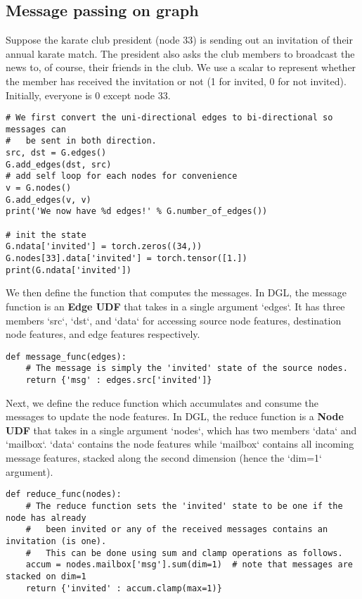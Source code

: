 \subsection{Message passing on graph}
Suppose the karate club president (node 33) is sending out an invitation of their annual karate match. The president also asks the club members to broadcast the news to, of course, their friends in the club. We use a scalar to represent whether the member has received the invitation or not (1 for invited, 0 for not invited). Initially, everyone is 0 except node 33.
\begin{verbatim}
# We first convert the uni-directional edges to bi-directional so messages can
#   be sent in both direction.
src, dst = G.edges()
G.add_edges(dst, src)
# add self loop for each nodes for convenience
v = G.nodes()
G.add_edges(v, v)
print('We now have %d edges!' % G.number_of_edges())

# init the state
G.ndata['invited'] = torch.zeros((34,))
G.nodes[33].data['invited'] = torch.tensor([1.])
print(G.ndata['invited'])
\end{verbatim}

We then define the function that computes the messages. In DGL, the message function is an \textbf{Edge UDF} that takes in a single argument `edges`. It has three members `src`, `dst`, and `data` for accessing source node features, destination node features, and edge features respectively.
\begin{verbatim}
def message_func(edges):
    # The message is simply the 'invited' state of the source nodes.
    return {'msg' : edges.src['invited']}
\end{verbatim}


Next, we define the reduce function which accumulates and consume the messages to update the node features. In DGL, the reduce function is a \textbf{Node UDF} that takes in a single argument `nodes`, which has two members `data` and `mailbox`. `data` contains the node features while `mailbox` contains all incoming message features, stacked along the second dimension (hence the `dim=1` argument).

\begin{verbatim}
def reduce_func(nodes):
    # The reduce function sets the 'invited' state to be one if the node has already
    #   been invited or any of the received messages contains an invitation (is one).
    #   This can be done using sum and clamp operations as follows.
    accum = nodes.mailbox['msg'].sum(dim=1)  # note that messages are stacked on dim=1
    return {'invited' : accum.clamp(max=1)}
\end{verbatim}

